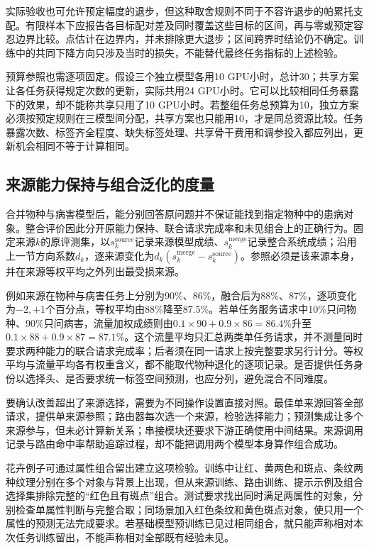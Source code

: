 实际验收也可允许预定幅度的退步，但这种取舍规则不同于不容许退步的帕累托支配。有限样本下应报告各目标配对差及同时覆盖这些目标的区间，再与零或预定容忍边界比较。点估计在边界内，并未排除更大退步；区间跨界时结论仍不确定。训练中的共同下降方向只涉及当时的损失，不能替代最终任务指标的上述检验。

预算参照也需逐项固定。假设三个独立模型各用10 GPU小时，总计30；共享方案让各任务获得规定次数的更新，实际共用24 GPU小时。它可以比较相同任务暴露下的效果，却不能称共享只用了10 GPU小时。若整组任务总预算为10，独立方案必须按预定规则在三模型间分配，共享方案也只能用10，才是同总资源比较。任务暴露次数、标签齐全程度、缺失标签处理、共享骨干费用和调参投入都应列出，更新机会相同不等于计算相同。

\subsection{来源能力保持与组合泛化的度量}
\label{sec:ket-evaluation-composition}

合并物种与病害模型后，能分别回答原问题并不保证能找到指定物种中的患病对象。整合评价因此分开原能力保持、联合请求完成率和未见组合上的正确行为。固定来源$k$的原评测集，以$s_k^{\mathrm{source}}$记录来源模型成绩、$s_k^{\mathrm{merge}}$记录整合系统成绩；沿用上一节方向系数$d_k$，逐来源变化为$d_k(s_k^{\mathrm{merge}}-s_k^{\mathrm{source}})$。参照必须是该来源本身，并在来源等权平均之外列出最受损来源。

例如来源在物种与病害任务上分别为90\%、86\%，融合后为88\%、87\%，逐项变化为$-2,+1$个百分点，等权平均由88\%降至87.5\%。若单任务服务请求中10\%只问物种、90\%只问病害，流量加权成绩则由$0.1\times90+0.9\times86=86.4\%$升至$0.1\times88+0.9\times87=87.1\%$。这个流量平均只汇总两类单任务请求，并不测量同时要求两种能力的联合请求完成率；后者须在同一请求上按完整要求另行计分。等权平均与流量平均各有权重含义，都不能取代物种退化的逐项记录。是否提供任务身份以选择头、是否要求统一标签空间预测，也应分列，避免混合不同难度。

要确认改善超出了来源选择，需要为不同操作设置直接对照。最佳单来源回答全部请求，提供单来源参照；路由器每次选一个来源，检验选择能力；预测集成让多个来源参与，但未必计算新关系；串接模块还要求下游正确使用中间结果。来源调用记录与路由命中率帮助追踪过程，却不能把调用两个模型本身算作组合成功。

花卉例子可通过属性组合留出建立这项检验。训练中让红、黄两色和斑点、条纹两种纹理分别在多个对象与背景上出现，但从来源训练、路由训练、提示示例及组合选择集排除完整的“红色且有斑点”组合。测试要求找出同时满足两属性的对象，分别检查单属性判断与完整合取；同场景加入红色条纹和黄色斑点对象，使只用一个属性的预测无法完成要求。若基础模型预训练已见过相同组合，就只能声称相对本次任务训练留出，不能声称相对全部既有经验未见。

